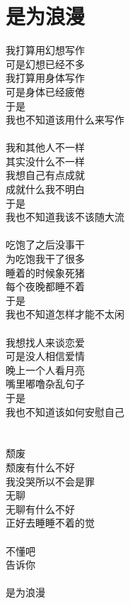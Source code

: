 \chapter{是为浪漫}

\leftskip=30mm
\noindent
我打算用幻想写作\\
可是幻想已经不多\\
我打算用身体写作\\
可是身体已经疲倦\\
于是\\
我也不知道该用什么来写作\\
\\
我和其他人不一样\\
其实没什么不一样\\
我想自己有点成就\\
成就什么我不明白\\
于是\\
我也不知道我该不该随大流\\
\\
吃饱了之后没事干\\
为吃饱我干了很多\\
睡着的时候象死猪\\
每个夜晚都睡不着\\
于是\\
我也不知道怎样才能不太闲\\
\\
我想找人来谈恋爱\\
可是没人相信爱情\\
晚上一个人看月亮\\
嘴里嘟噜杂乱句子\\
于是\\
我也不知道该如何安慰自己\\
\\
\\
颓废\\
颓废有什么不好\\
我没哭所以不会是罪\\
无聊\\
无聊有什么不好\\
正好去睡睡不着的觉\\
\\
不懂吧\\
告诉你\\
\\
是为浪漫
